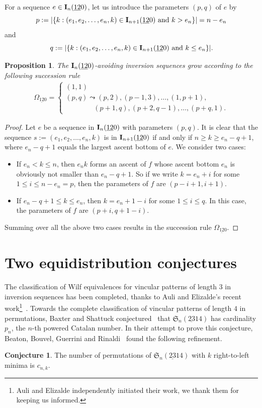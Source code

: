 \documentclass[12pt,A4]{amsart}
\numberwithin{equation}{section}
\theoremstyle{plain}
\newtheorem{proposition}[theorem]{Proposition}
\theoremstyle{definition}
\newtheorem{conjecture}[theorem]{Conjecture}
\def\S{\mathfrak{S}}
\def\I{\operatorname{{\bf I}}}
\begin{document}
For a sequence $e\in\I_n(\underline{12}0)$, let us introduce the parameters $(p,q)$ of $e$ by 
$$
p:=|\{k: (e_1,e_2,\ldots,e_n,k)\in\I_{n+1}(\underline{12}0)\text{ and } k>e_n\}|=n-e_n
$$
and 
$$
q:=|\{k: (e_1,e_2,\ldots,e_n,k)\in\I_{n+1}(\underline{12}0) \text{ and } k\leq e_n\}|.
$$

\begin{proposition}\label{succ:3}
The $\I_n(\underline{12}0)$-avoiding inversion sequences grow according to the following succession rule 
\begin{align*}
\Omega_{\mathrm{\underline{12}0}}=\begin{cases}
(1,1) \\
(p,q)\leadsto (p,2), (p-1,3),\ldots,(1,p+1),\\
\qquad\qquad (p+1,q),(p+2,q-1), \dots, (p+q,1).
\end{cases}
\end{align*}
\end{proposition}
\begin{proof}
Let $e$ be a sequence in $\I_n(\underline{12}0)$ with parameters $(p,q)$. It is clear that the sequence $s:=(e_1,e_2,\ldots,e_n,k)$ is in $\I_{n+1}(\underline{12}0)$ if and only if $n\geq k\geq e_n-q+1$, where $e_n-q+1$ equals the largest ascent bottom of $e$. We consider two cases:
\begin{itemize}
\item If $e_n<k\leq n$, then $e_n k$ forms an ascent of $f$ whose ascent bottom $e_n$ is obviously not smaller than $e_n-q+1$. So if we write $k=e_n+i$ for some $1\leq i\leq n-e_n=p$, then the parameters of $f$ are $(p-i+1,i+1)$. 
\item If $e_n-q+1\leq k\leq e_n$, then $k=e_n+1-i$ for some $1\leq i\leq q$. In this case, the parameters of $f$ are $(p+i,q+1-i)$. 
\end{itemize}
Summing over all the above two cases results in the succession rule $\Omega_{\mathrm{\underline{12}0}}$.
\end{proof}


\section{Two equidistribution conjectures}%




The classification of Wilf equivalences for vincular patterns of length $3$ in inversion sequences has been completed, thanks to Auli and Elizalde's recent work\footnote{Auli and Elizalde independently initiated their work, we thank them for keeping us informed.}~\cite{auli3}.
Towards the complete classification of vincular patterns of length $4$ in permutations, 
 Baxter and Shattuck conjectured~\cite{bs} that $\S_n(\underline{23}14)$ has cardinality $p_n$, the $n$-th powered Catalan number. In their attempt to prove this conjecture, Beaton, Bouvel, Guerrini and Rinaldi~\cite[Conj.~23]{bbgr} found the following refinement.
\begin{conjecture}\label{23-1-4}
The number of permutations of $\S_n(\underline{23}14)$ with $k$ right-to-left minima is $c_{n,k}$. 
\end{conjecture}
\end{document}
